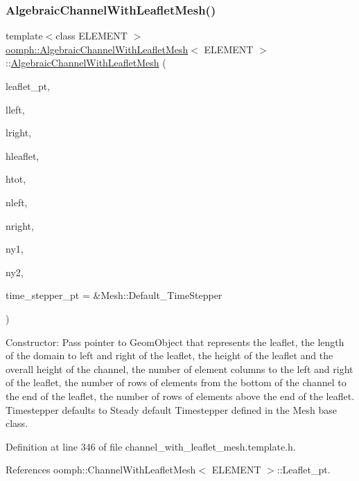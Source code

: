 \subsubsection{\texorpdfstring{Algebraic\+Channel\+With\+Leaflet\+Mesh()}{AlgebraicChannelWithLeafletMesh()}}
{\footnotesize\ttfamily template$<$class E\+L\+E\+M\+E\+NT $>$ \\
\hyperlink{classoomph_1_1AlgebraicChannelWithLeafletMesh}{oomph\+::\+Algebraic\+Channel\+With\+Leaflet\+Mesh}$<$ E\+L\+E\+M\+E\+NT $>$\+::\hyperlink{classoomph_1_1AlgebraicChannelWithLeafletMesh}{Algebraic\+Channel\+With\+Leaflet\+Mesh} (\begin{DoxyParamCaption}\item[{Geom\+Object $\ast$}]{leaflet\+\_\+pt,  }\item[{const double \&}]{lleft,  }\item[{const double \&}]{lright,  }\item[{const double \&}]{hleaflet,  }\item[{const double \&}]{htot,  }\item[{const unsigned \&}]{nleft,  }\item[{const unsigned \&}]{nright,  }\item[{const unsigned \&}]{ny1,  }\item[{const unsigned \&}]{ny2,  }\item[{Time\+Stepper $\ast$}]{time\+\_\+stepper\+\_\+pt = {\ttfamily \&Mesh\+:\+:Default\+\_\+TimeStepper} }\end{DoxyParamCaption})\hspace{0.3cm}{\ttfamily [inline]}}



Constructor\+: Pass pointer to Geom\+Object that represents the leaflet, the length of the domain to left and right of the leaflet, the height of the leaflet and the overall height of the channel, the number of element columns to the left and right of the leaflet, the number of rows of elements from the bottom of the channel to the end of the leaflet, the number of rows of elements above the end of the leaflet. Timestepper defaults to Steady default Timestepper defined in the Mesh base class. 



Definition at line 346 of file channel\+\_\+with\+\_\+leaflet\+\_\+mesh.\+template.\+h.



References oomph\+::\+Channel\+With\+Leaflet\+Mesh$<$ E\+L\+E\+M\+E\+N\+T $>$\+::\+Leaflet\+\_\+pt.

